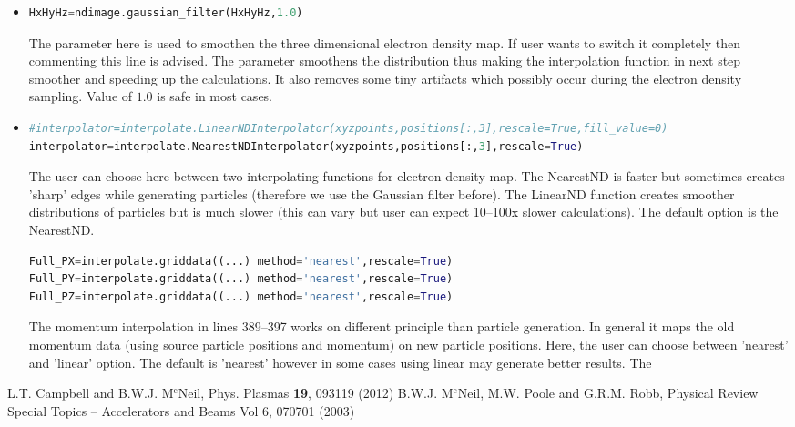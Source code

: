\documentclass[12pt]{article}
\begin{document}
\begin{itemize}
\item
\begin{lstlisting}[language=Python]
HxHyHz=ndimage.gaussian_filter(HxHyHz,1.0)
\end{lstlisting}
The parameter here is used to smoothen the three dimensional electron density map. If user wants to switch it completely then commenting this line is advised. The parameter smoothens the distribution thus making the interpolation function in next step smoother and speeding up the calculations. It also removes some tiny artifacts which possibly occur during the electron density sampling. Value of $1.0$ is safe in most cases.

\item

\begin{lstlisting}[language=Python]
#interpolator=interpolate.LinearNDInterpolator(xyzpoints,positions[:,3],rescale=True,fill_value=0)
interpolator=interpolate.NearestNDInterpolator(xyzpoints,positions[:,3],rescale=True)
\end{lstlisting}
The user can choose here between two interpolating functions for electron density map. The NearestND is faster but sometimes creates 'sharp' edges while generating particles (therefore we use the Gaussian filter before). The LinearND function creates smoother distributions of particles but is much slower (this can vary but user can expect 10--100x slower calculations). The default option is the NearestND.

\begin{lstlisting}[language=Python]
Full_PX=interpolate.griddata((...) method='nearest',rescale=True)
Full_PY=interpolate.griddata((...) method='nearest',rescale=True)
Full_PZ=interpolate.griddata((...) method='nearest',rescale=True)
\end{lstlisting}
The momentum interpolation in lines 389--397 works on different principle than particle generation. In general it maps the old momentum data (using source particle positions and momentum) on new particle positions. Here, the user can choose between 'nearest' and 'linear' option. The default is 'nearest' however in some cases using linear may generate better results. The 
\end{itemize}


\begin{thebibliography}{9}

L.T. Campbell and B.W.J. M$^{\mathrm c}$Neil, Phys. Plasmas {\bf 19}, 093119 (2012)
B.W.J. M$^{\mathrm c}$Neil, M.W. Poole and G.R.M. Robb, Physical Review Special Topics -- Accelerators and Beams Vol 6, 070701 (2003)
\end{thebibliography}
\end{document}
